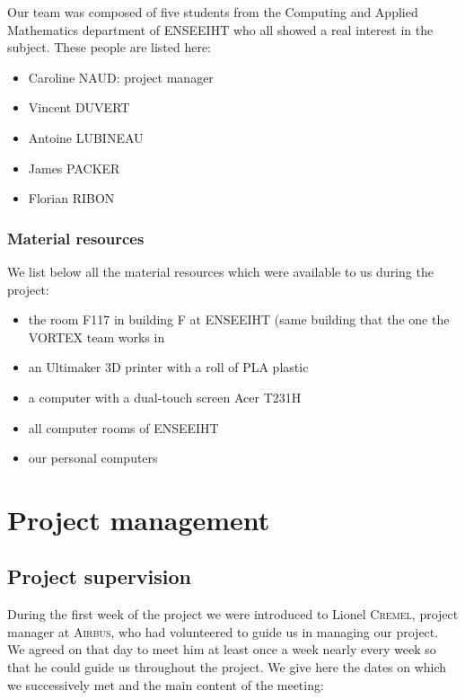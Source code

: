 \documentclass{report}
\begin{document}
	Our team was composed of five students from the Computing and Applied Mathematics department of ENSEEIHT who all showed a real interest in the subject. These people are listed here:

\begin{itemize}
\item Caroline \textsc{NAUD}: project manager
\item Vincent \textsc{DUVERT}
\item Antoine \textsc{LUBINEAU}
\item James \textsc{PACKER}
\item Florian \textsc{RIBON}
\end{itemize}

\subsection{Material resources}

	We list below all the material resources which were available to us during the project:

\begin{itemize}
\item the room F117 in building F at ENSEEIHT (same building that the one the \textsc{VORTEX} team works in
\item an Ultimaker 3D printer with a roll of PLA plastic
\item a computer with a dual-touch screen Acer T231H
\item all computer rooms of ENSEEIHT
\item our personal computers
\end{itemize}

\chapter{Project management}

\section{Project supervision}

	During the first week of the project we were introduced to Lionel \textsc{Cremel}, project manager at \textsc{Airbus}, who had volunteered to guide us in managing our project. We agreed on that day to meet him at least once a week nearly every week so that he could guide us throughout the project. We give here the dates on which we successively met and the main content of the meeting:
	
\end{document}
